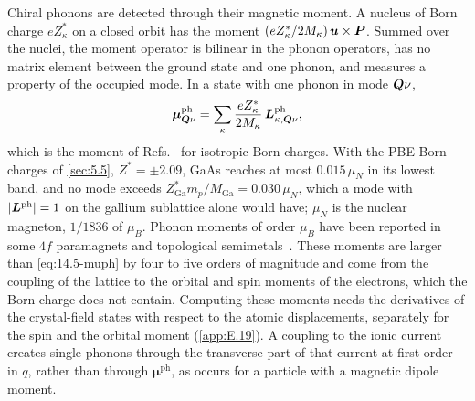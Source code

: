 Chiral phonons are detected through their magnetic moment. A nucleus of Born charge $eZ^*_\kappa$ on a closed orbit has the moment $(eZ^*_\kappa/2M_\kappa)\,\bm{u}\times\bm{P}$. Summed over the nuclei, the moment operator is bilinear in the phonon operators, has no matrix element between the ground state and one phonon, and measures a property of the occupied mode. In a state with one phonon in mode $\bm{Q}\nu$,
\begin{equation}
  \boldsymbol{\mu}^{\mathrm{ph}}_{\bm{Q}\nu} = \sum_\kappa\frac{eZ^*_\kappa}{2M_\kappa}\,\bm{L}^{\mathrm{ph}}_{\kappa,\bm{Q}\nu} ,
  \label{eq:14.5-muph}
\end{equation}
which is the moment of Refs.~\cites[Eq.~(7)]{romao2023chiral}[Eq.~(12)]{matas2025chiral} for isotropic Born charges. With the PBE Born charges of \cref{sec:5.5}, $Z^* = \pm2.09$, GaAs reaches at most $0.015\,\mu_N$ in its lowest band, and no mode exceeds $Z^*_{\mathrm{Ga}}m_p/M_{\mathrm{Ga}} = 0.030\,\mu_N$, which a mode with $|\bm{L}^{\mathrm{ph}}| = 1$ on the gallium sublattice alone would have; $\mu_N$ is the nuclear magneton, $1/1836$ of $\mu_B$. Phonon moments of order $\mu_B$ have been reported in some $4f$ paramagnets and topological semimetals~\cite[Sect.~II]{romao2023chiral}. These moments are larger than \cref{eq:14.5-muph} by four to five orders of magnitude and come from the coupling of the lattice to the orbital and spin moments of the electrons, which the Born charge does not contain. Computing these moments needs the derivatives of the crystal-field states with respect to the atomic displacements, separately for the spin and the orbital moment (\cref{app:E.19}). A coupling to the ionic current creates single phonons through the transverse part of that current at first order in $q$, rather than through $\boldsymbol{\mu}^{\mathrm{ph}}$, as occurs for a particle with a magnetic dipole moment.

